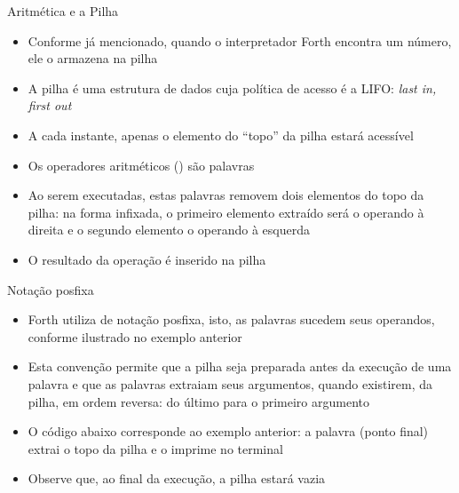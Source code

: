 \begin{frame}[fragile]{Aritmética e a Pilha}

    \begin{itemize}
        \item Conforme já mencionado, quando o interpretador Forth encontra um número, ele o armazena
            na pilha

        \item A pilha é uma estrutura de dados cuja política de acesso é a LIFO: \textit{last in,
            first out}

        \item A cada instante, apenas o elemento do ``topo'' da pilha estará acessível

        \item Os operadores aritméticos () são palavras

        \item Ao serem executadas, estas palavras removem dois elementos do topo da pilha: na forma
            infixada, o primeiro elemento extraído será o operando à direita e o segundo elemento o
            operando à esquerda

        \item O resultado da operação é inserido na pilha
    \end{itemize}

\end{frame}



\begin{frame}[fragile]{Notação posfixa}

    \begin{itemize}
        \item Forth utiliza de notação posfixa, isto, as palavras sucedem seus operandos, conforme
            ilustrado no exemplo anterior

        \item Esta convenção permite que a pilha seja preparada antes da execução de uma palavra e que
            as palavras extraiam seus argumentos, quando existirem, da pilha, em ordem reversa: do
            último para o primeiro argumento

        \item O código abaixo corresponde ao exemplo anterior: a palavra  (ponto final)
            extrai o topo da pilha e o imprime no terminal


            \vspace{0.1in}
        
        \item Observe que, ao final da execução, a pilha estará vazia

    \end{itemize}

\end{frame}

